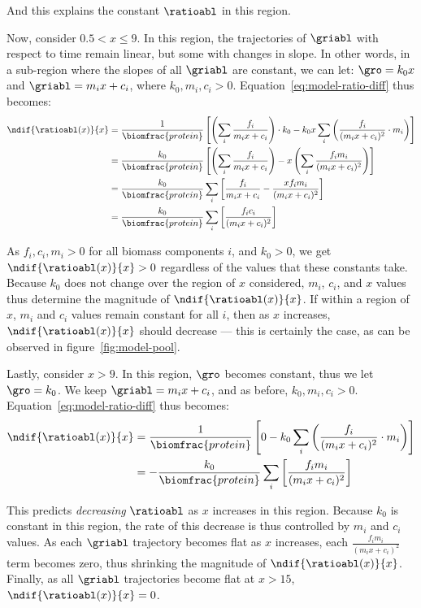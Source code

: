 And this explains the constant $\ratioabl$ in this region.

Now, consider $0.5 < x \leq 9$.
In this region, the trajectories of $\griabl$ with respect to time remain linear, but some with changes in slope.
In other words, in a sub-region where the slopes of all $\griabl$ are constant, we can let: $\gro = k_{0}x$ and $\griabl = m_{i}x + c_{i}$, where $k_{0}, m_{i}, c_{i} > 0$.
Equation~\ref{eq:model-ratio-diff} thus becomes:
\begin{equation}
  \begin{aligned}
  \ndif{\ratioabl(x)}{x} &= \frac{1}{\biomfrac{protein}} \left[ \left( \sum_i \frac{f_i}{m_{i}x+c_{i}} \right) \cdot k_{0} - k_{0}x \sum_{i}\left( \frac{f_{i}}{(m_{i}x+c_{i})^{2}} \cdot m_{i} \right) \right]\\
  &= \frac{k_{0}}{\biomfrac{protein}} \left[ \left( \sum_i \frac{f_i}{m_{i}x+c_{i}} \right) - x \left( \sum_{i} \frac{f_{i}m_{i}}{(m_{i}x+c_{i})^{2}} \right) \right]\\
  &= \frac{k_{0}}{\biomfrac{protein}} \sum_{i} \left[ \frac{f_i}{m_{i}x+c_{i}} - \frac{xf_{i}m_{i}}{(m_{i}x+c_{i})^{2}} \right]\\
  &= \frac{k_{0}}{\biomfrac{protein}} \sum_{i} \left[ \frac{f_{i}c_{i}}{(m_{i}x+c_{i})^{2}} \right]
  \end{aligned}
  \label{eq:model-ratio-diff-midx}
\end{equation}

As $f_{i}, c_{i}, m_{i} > 0$ for all biomass components $i$, and $k_{0} > 0$, we get $\ndif{\ratioabl(x)}{x} > 0$ regardless of the values that these constants take.
Because $k_{0}$ does not change over the region of $x$ considered, $m_{i}$, $c_{i}$, and $x$ values thus determine the magnitude of $\ndif{\ratioabl(x)}{x}$.
If within a region of $x$, $m_{i}$ and $c_{i}$ values remain constant for all $i$, then as $x$ increases, $\ndif{\ratioabl(x)}{x}$ should decrease --- this is certainly the case, as can be observed in figure~\ref{fig:model-pool}.

Lastly, consider $x > 9$.
In this region, $\gro$ becomes constant, thus we let $\gro = k_{0}$.
We keep $\griabl = m_{i}x + c_{i}$, and as before, $k_{0}, m_{i}, c_{i} > 0$.
Equation~\ref{eq:model-ratio-diff} thus becomes:
\begin{equation}
  \begin{aligned}
  \ndif{\ratioabl(x)}{x} &= \frac{1}{\biomfrac{protein}} \left[ 0 - k_{0} \sum_{i}\left( \frac{f_{i}}{(m_{i}x+c_{i})^{2}} \cdot m_{i} \right) \right]\\
  &= -\frac{k_{0}}{\biomfrac{protein}} \sum_{i}\left[ \frac{f_{i}m_{i}}{(m_{i}x+c_{i})^{2}} \right]
  \end{aligned}
  \label{eq:model-ratio-diff-largex}
\end{equation}

This predicts \emph{decreasing} $\ratioabl$ as $x$ increases in this region.
Because $k_{0}$ is constant in this region, the rate of this decrease is thus controlled by $m_{i}$ and $c_{i}$ values.
As each $\griabl$ trajectory becomes flat as $x$ increases, each $\frac{f_{i}m_{i}}{(m_{i}x+c_{i})^{2}}$ term becomes zero, thus shrinking the magnitude of $\ndif{\ratioabl(x)}{x}$.
Finally, as all $\griabl$ trajectories become flat at $x > 15$, $\ndif{\ratioabl(x)}{x} = 0$.
